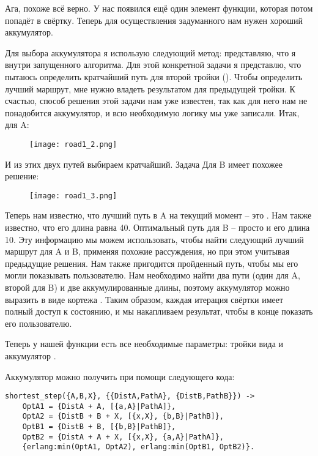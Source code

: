 Ага, похоже всё верно.
У нас появился ещё один элемент функции, которая потом попадёт в свёртку.
Теперь для осуществления задуманного нам нужен хороший аккумулятор.

Для выбора аккумулятора я использую следующий метод: представляю, что я внутри запущенного алгоритма.
Для этой конкретной задачи я представлю, что пытаюсь определить кратчайший путь для второй тройки ().
Чтобы определить лучший маршрут, мне нужно владеть результатом для предыдущей тройки.
К счастью, способ решения этой задачи нам уже известен, так как для него нам не понадобится аккумулятор, и всю необходимую логику мы уже записали.
Итак, для A:
\begin{figure}[h!]
    \texttt{[image: road1\_2.png]}
\end{figure}

И из этих двух путей выбираем кратчайший.
\clearpage
Задача Для B имеет похожее решение:
\begin{figure}[!htbp]
    \texttt{[image: road1\_3.png]}
\end{figure}

Теперь нам известно, что лучший путь в A на текущий момент \--- это \ops{[B,X]}.
Нам также известно, что его длина равна 40.
Оптимальный путь для B \--- просто \ops{[B]} и его длина 10.
Эту информацию мы можем использовать, чтобы найти следующий лучший маршрут для A и B, применяя похожие рассуждения, но при этом учитывая предыдущие решения.
Нам также пригодится пройденный путь, чтобы мы его могли показывать пользователю.
Нам необходимо найти два пути (один для A, второй для B) и две аккумулированные длины, поэтому аккумулятор можно выразить в виде кортежа .
Таким образом, каждая итерация свёртки имеет полный доступ к состоянию, и мы накапливаем результат, чтобы в конце показать его пользователю.

Теперь у нашей функции есть все необходимые параметры: тройки вида  и аккумулятор .

Аккумулятор можно получить при помощи следующего кода:
\begin{lstlisting}[style=erlang]
shortest_step({A,B,X}, {{DistA,PathA}, {DistB,PathB}}) ->
    OptA1 = {DistA + A, [{a,A}|PathA]},
    OptA2 = {DistB + B + X, [{x,X}, {b,B}|PathB]},
    OptB1 = {DistB + B, [{b,B}|PathB]},
    OptB2 = {DistA + A + X, [{x,X}, {a,A}|PathA]},
    {erlang:min(OptA1, OptA2), erlang:min(OptB1, OptB2)}.
\end{lstlisting}

